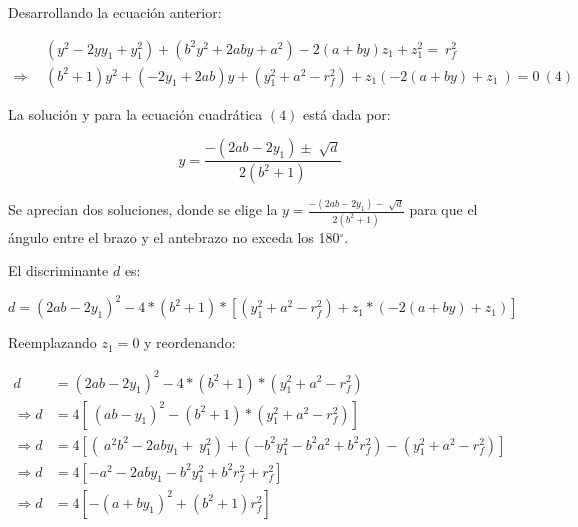         Desarrollando la ecuación anterior:
        
        \begin{align*}
         &\left( y^{2}-2yy_{1}+y_{1}^{2} \right) + \left( b^{2}y^{2}+2aby+a^{2} \right) -2 \left( a+by \right) z_{1}+ z_{1}^{2}=~r_{f}^{2}~\\
         \Longrightarrow ~~  & \left( b^{2}+1 \right) y^{2}+ \left( -2y_{1}+2ab \right) y + \left( y_{1}^{2}+a^{2}-r_{f}^{2} \right) +z_{1} \left( -2 \left( a+by \right) +z_{1}~ \right) =0~  \left( 4 \right)
        \end{align*}
        
        La solución y para la ecuación cuadrática $(4)$ está dada por:
        
        \begin{equation*}
             y= \frac{- \left( 2ab-2y_{1} \right)   \pm \sqrt[]{d}}{2 \left( b^{2}+1 \right) }
        \end{equation*}
        
        Se aprecian dos soluciones, donde se elige la $y=\frac{- \left( 2ab-2y_{1} \right) -\sqrt[]{d}}{2 \left( b^{2}+1 \right) }$ para que el ángulo entre el brazo y el antebrazo no exceda los 180$ ^{\circ} $.
        
        El discriminante $d$ es:
        
        \begin{equation*}
             d= \left( 2ab-2y_{1} \right) ^{2}-4\ast \left( b^{2}+1 \right) \ast \left[  \left( y_{1}^{2}+a^{2}-r_{f}^{2} \right) +z_{1}\ast \left( -2 \left( a+by \right) +z_{1}\right)  \right]
        \end{equation*}
        
        Reemplazando $z_{1}=0$ y reordenando:
        
        \begin{align*}
         d&= \left( 2ab-2y_{1} \right) ^{2}-4\ast \left( b^{2}+1 \right) \ast \left( y_{1}^{2}+a^{2}-r_{f}^{2} \right) \\
         \Longrightarrow d&=4 \left[ ~ \left( ab-y_{1} \right) ^{2}- \left( b^{2}+1 \right) \ast \left( y_{1}^{2}+a^{2}-r_{f}^{2} \right)  \right]  \\
         \Longrightarrow d&=4 \left[  \left( ~a^{2}b^{2}-2aby_{1}+~y_{1}^{2} \right) + \left( -b^{2}y_{1}^{2}-b^{2}a^{2}+b^{2}r_{f}^{2} \right) - \left( y_{1}^{2}+a^{2}-r_{f}^{2} \right)  \right]  \\
         \Longrightarrow d&=4 \left[ -a^{2}-2aby_{1}-b^{2}y_{1}^{2}+b^{2}r_{f}^{2}+r_{f}^{2} \right]  \\
         \Longrightarrow d&=4 \left[ - \left( a+by_{1} \right) ^{2}+ \left( b^{2}+1 \right) r_{f}^{2} \right]  \\ 
        \end{align*}
        
